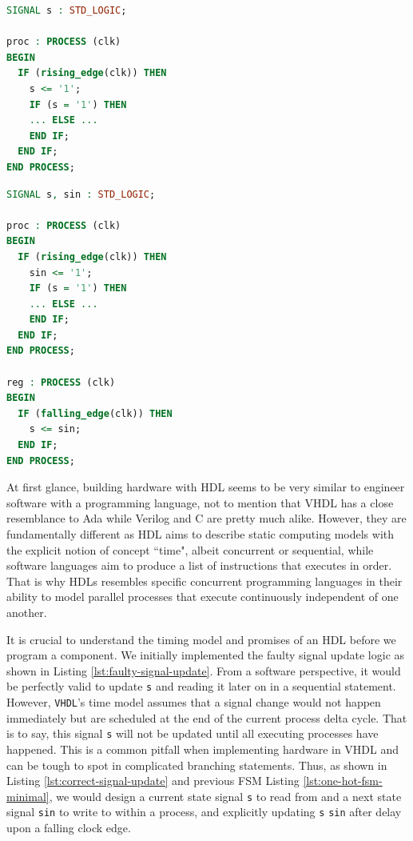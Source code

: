 \documentclass[a4paper]{report}
\newcommand{\proglang}{\textsf}
\newcommand{\code}{\texttt}
\begin{document}
\begin{minipage}{.45\textwidth}
\begin{lstlisting}[language=VHDL, caption=Faulty Signal Update in \proglang{VHDL}, label={lst:faulty-signal-update}]
SIGNAL s : STD_LOGIC;

proc : PROCESS (clk)
BEGIN
  IF (rising_edge(clk)) THEN
    s <= '1';
    IF (s = '1') THEN
    ... ELSE ...
    END IF;
  END IF;
END PROCESS;
\end{lstlisting}
\end{minipage}\hfill
\begin{minipage}{.45\textwidth}
\begin{lstlisting}[language=VHDL, caption=Correct Signal Update in \proglang{VHDL}, label={lst:correct-signal-update}]
SIGNAL s, sin : STD_LOGIC;

proc : PROCESS (clk)
BEGIN
  IF (rising_edge(clk)) THEN
    sin <= '1';
    IF (s = '1') THEN
    ... ELSE ...
    END IF;
  END IF;
END PROCESS;

reg : PROCESS (clk)
BEGIN
  IF (falling_edge(clk)) THEN
    s <= sin;
  END IF;
END PROCESS;
\end{lstlisting}
\end{minipage}

At first glance, building hardware with HDL seems to be very similar to engineer software with a programming language, not to mention that \proglang{VHDL} has a close resemblance to \proglang{Ada} while \proglang{Verilog} and \proglang{C} are pretty much alike. However, they are fundamentally different as HDL aims to describe static computing models with the explicit notion of concept ``time", albeit concurrent or sequential, while software languages aim to produce a list of instructions that executes in order. That is why HDLs resembles specific concurrent programming languages in their ability to model parallel processes that execute continuously independent of one another.

It is crucial to understand the timing model and promises of an HDL before we program a component. We initially implemented the faulty signal update logic as shown in Listing \ref{lst:faulty-signal-update}. From a software perspective, it would be perfectly valid to update \code{s} and reading it later on in a sequential statement. However, \code{VHDL}'s time model assumes that a signal change would not happen immediately but are scheduled at the end of the current process delta cycle. That is to say, this signal \code{s} will not be updated until all executing processes have happened. This is a common pitfall when implementing hardware in \proglang{VHDL} and can be tough to spot in complicated branching statements. Thus, as shown in Listing \ref{lst:correct-signal-update} and previous FSM Listing \ref{lst:one-hot-fsm-minimal}, we would design a current state signal \code{s} to read from and a next state signal \code{sin} to write to within a process, and explicitly updating \code{s} \textleftarrow \code{sin} after delay upon a falling clock edge. 
\end{document}
